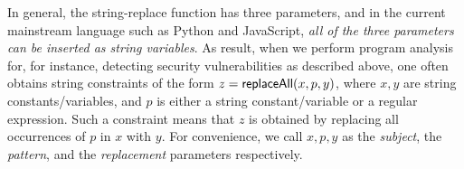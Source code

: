 In general, the string-replace function has three parameters, and in the current mainstream language such as Python and JavaScript, \emph{all of the three parameters can be inserted as string variables}. As result, when we perform program analysis for, for instance, detecting security vulnerabilities as described above, one often obtains string constraints of the form $z= \mathsf{replaceAll}(x, p, y)$, where $x,y$ are string constants/variables, and $p$ is either a string constant/variable or a regular expression.
Such a constraint means that $z$ is obtained by replacing all occurrences of $p$
in $x$ with $y$. For convenience, we call $x, p, y$ as the \emph{subject}, the
\emph{pattern}, and the \emph{replacement} parameters respectively. 





